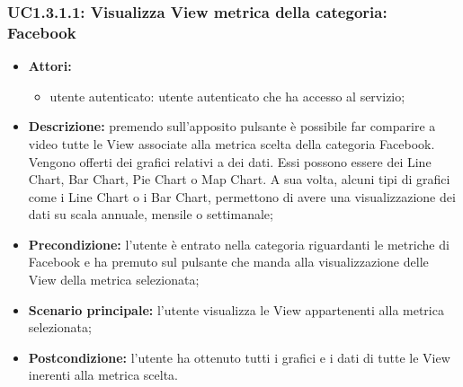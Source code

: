 \subsubsection{UC1.3.1.1: Visualizza View metrica della categoria: Facebook}
\begin{itemize}
	\item \textbf{Attori:}
	\begin{itemize}
		\item utente autenticato: utente autenticato che ha accesso al servizio;
	\end{itemize}
	\item \textbf{Descrizione:} premendo sull'apposito pulsante è possibile far comparire a video tutte le View associate alla metrica scelta della categoria Facebook. Vengono offerti dei grafici relativi a dei dati. Essi possono essere dei Line Chart, Bar Chart, Pie Chart o Map Chart. A sua volta, alcuni tipi di grafici come i Line Chart o i Bar Chart, permettono di avere una visualizzazione dei dati su scala annuale, mensile o settimanale;
	\item \textbf{Precondizione:} l'utente è entrato nella categoria riguardanti le metriche di Facebook e ha premuto sul pulsante che manda alla visualizzazione delle View della metrica selezionata;
	\item \textbf{Scenario principale:} l'utente visualizza le View appartenenti alla metrica selezionata;
	\item \textbf{Postcondizione:} l'utente ha ottenuto tutti i grafici e i dati di tutte le View inerenti alla metrica scelta.
\end{itemize}

